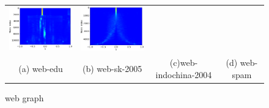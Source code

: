 \documentclass[senior,final,11pt]{iscs-thesis}
\begin{document}
\begin{figure}[htbp]
\begin{tabular}{cccc}
    \includegraphics[width=45mm]{figure/web-indochina-2004mtx_pdos.png} &
    \includegraphics[width=45mm]{figure/web-spammtx_pdos.png} \\
    (a) web-edu & (b) web-sk-2005 & (c)web-indochina-2004  & (d) web-spam\\ [6pt]
  \end{tabular}
  \caption{web graph  }
  \label{fig:web  }
  \end{figure}
\end{document}
